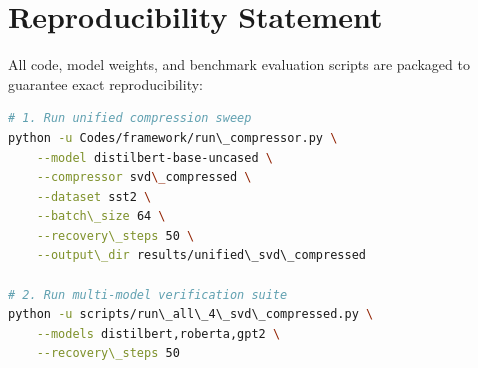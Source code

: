 \section{Reproducibility Statement}
All code, model weights, and benchmark evaluation scripts are packaged to guarantee exact reproducibility:
\begin{lstlisting}[language=bash]
# 1. Run unified compression sweep
python -u Codes/framework/run\_compressor.py \
    --model distilbert-base-uncased \
    --compressor svd\_compressed \
    --dataset sst2 \
    --batch\_size 64 \
    --recovery\_steps 50 \
    --output\_dir results/unified\_svd\_compressed

# 2. Run multi-model verification suite
python -u scripts/run\_all\_4\_svd\_compressed.py \
    --models distilbert,roberta,gpt2 \
    --recovery\_steps 50
\end{lstlisting}
